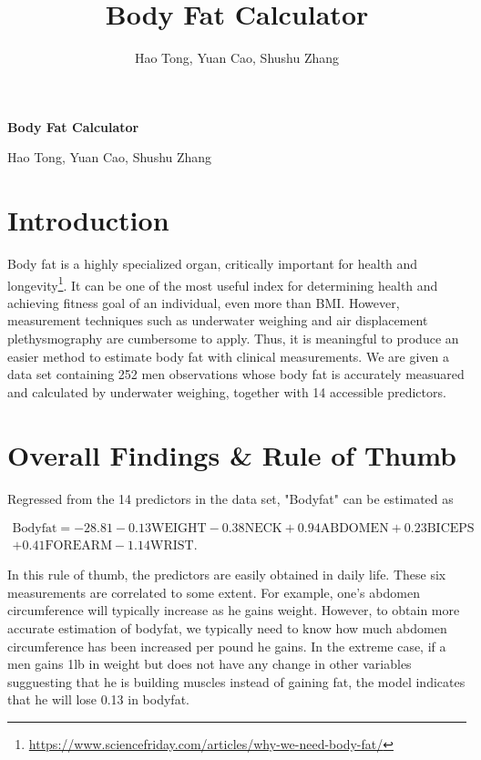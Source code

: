 \documentclass[11pt, letterpaper]{article}
\title{Body Fat Calculator}
\author{Hao Tong, Yuan Cao, Shushu Zhang}
\begin{document}
\begin{center}
\begin{spacing}{1}
\Large\textbf{Body Fat Calculator} 

\normalsize Hao Tong, Yuan Cao, Shushu Zhang
\end{spacing}
\end{center}

\section{Introduction}
\label{sec:1}
Body fat is a highly specialized organ, critically important for health and longevity\footnote{\url{https://www.sciencefriday.com/articles/why-we-need-body-fat/}}. It can be one of the most useful index for determining health and achieving fitness goal of an individual, even more than BMI. However, measurement techniques such as underwater weighing and air displacement plethysmography are 
cumbersome to apply. Thus, it is meaningful to produce an easier method to estimate body fat with clinical measurements. We are given a data set containing 252 men observations whose body fat is accurately measuared and calculated by underwater weighing, together with 14 accessible predictors. 

\section{Overall Findings \& Rule of Thumb}
\label{sec:2}
Regressed from the 14 predictors in the data set, "Bodyfat" can be estimated as
\begin{small}
\begin{equation}\label{eq:model}
\begin{aligned}
\mathrm{Bodyfat}=
-28.81-0.13\mathrm{WEIGHT}-0.38\mathrm{NECK}+0.94\mathrm{ABDOMEN}+0.23\mathrm{BICEPS}\\
+0.41\mathrm{FOREARM}-1.14\mathrm{WRIST}.
\end{aligned}
\end{equation}
\end{small}

 
In this rule of thumb, the predictors are easily obtained in daily life. These six measurements are correlated to some extent. For example, one's abdomen circumference will typically increase as he gains weight. However, to obtain more accurate estimation of bodyfat, we typically need to know how much abdomen circumference has been increased per pound he gains. In the extreme case, if a men gains 1lb in weight but does not have any change in other variables sugguesting that he is building muscles instead of gaining fat, the model indicates that he will lose 0.13 in bodyfat. 
\end{document}
